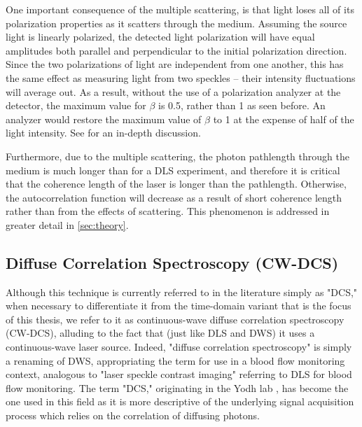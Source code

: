 One important consequence of the multiple scattering, is that light loses all of its polarization properties as it scatters through the medium. Assuming the source light is linearly polarized, the detected light polarization will have equal amplitudes both parallel and perpendicular to the initial polarization direction. Since the two polarizations of light are independent from one another, this has the same effect as measuring light from two speckles -- their intensity fluctuations will average out. As a result, without the use of a polarization analyzer at the detector, the maximum value for $\beta$ is 0.5, rather than 1 as seen before. An analyzer would restore the maximum value of $\beta$ to 1 at the expense of half of the light intensity. See \cite[ch. 16.3.1]{Brown1993} for an in-depth discussion.

Furthermore, due to the multiple scattering, the photon pathlength through the medium is much longer than for a DLS experiment, and therefore it is critical that the coherence length of the laser is longer than the pathlength. Otherwise, the autocorrelation function will decrease as a result of short coherence length rather than from the effects of scattering. This phenomenon is addressed in greater detail in \autoref{sec:theory}.


\subsection{Diffuse Correlation Spectroscopy (CW-DCS)} \label{sec:CW-DCS}
Although this technique is currently referred to in the literature simply as "DCS," when necessary to differentiate it from the time-domain variant that is the focus of this thesis, we refer to it as continuous-wave diffuse correlation spectroscopy (CW-DCS), alluding to the fact that (just like DLS and DWS) it uses a continuous-wave laser source. Indeed, "diffuse correlation spectroscopy" is simply a renaming of DWS, appropriating the term for use in a blood flow monitoring context, analogous to "laser speckle contrast imaging" \cite[ch. 5]{Madsen2013} referring to DLS for blood flow monitoring. The term "DCS," originating in the Yodh lab \cite{Cheung2001}, has become the one used in this field as it is more descriptive of the underlying signal acquisition process which relies on the correlation of diffusing photons. 



